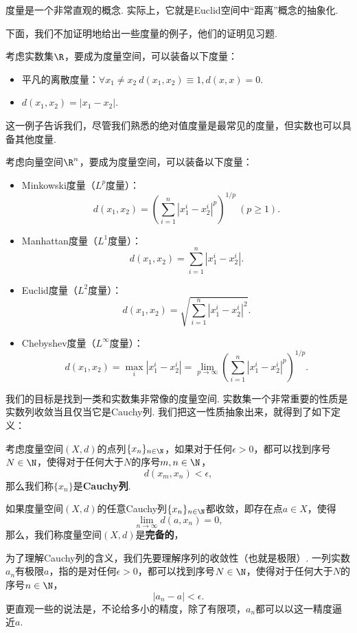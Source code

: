 度量是一个非常直观的概念. 实际上，它就是Euclid空间中“距离”概念的抽象化. 

下面，我们不加证明地给出一些度量的例子，他们的证明见习题.
\begin{example}
    考虑实数集$\R$，要成为度量空间，可以装备以下度量：
    \begin{itemize}
            \item 平凡的离散度量：$\forall x_1\neq x_2\ d(x_1,x_2)\equiv 1, d(x,x)=0$. 
            \item $d(x_1,x_2)=|x_1-x_2|$. 
        \end{itemize}
        这一例子告诉我们，尽管我们熟悉的绝对值度量是最常见的度量，但实数也可以具备其他度量.

        考虑向量空间$\R^n$，要成为度量空间，可以装备以下度量：
        \begin{itemize}
            \item Minkowski度量（$L^p$度量）：
            \[d(x_1,x_2)=\left(\sum_{i=1}^n|x_1^i-x_2^i|^p\right)^{1/p}\ (p\geq 1).\] 
            \item Manhattan度量（$L^1$度量）：
            \[d(x_1,x_2)=\sum_{i=1}^n|x_1^i-x_2^i|.\]
            \item Euclid度量（$L^2$度量）：
            \[d(x_1,x_2)=\sqrt{\sum_{i=1}^n|x_1^i-x_2^i|^2}.\]
            \item Chebyshev度量（$L^\infty$度量）：
            \[d(x_1,x_2)=\max_i|x_1^i-x_2^i|=\lim_{p\to\infty}\left(\sum_{i=1}^n|x_1^i-x_2^i|^p\right)^{1/p}.\]
        \end{itemize}
\end{example}

我们的目标是找到一类和实数集非常像的度量空间. 实数集一个非常重要的性质是实数列收敛当且仅当它是Cauchy列. 我们把这一性质抽象出来，就得到了如下定义：

\begin{definition}
    考虑度量空间$(X,d)$的点列$\{x_n\}_{n\in \N}$，如果对于任何$\epsilon>0$，都可以找到序号$N\in\N$，使得对于任何大于$N$的序号$m,n\in\N$，
    \[d(x_m,x_n)<\epsilon,\]
    那么我们称$\{x_n\}$是\textbf{Cauchy列}.

    如果度量空间$(X,d)$的任意Cauchy列$\{x_n\}_{n\in \N}$都收敛，即存在点$a\in X$，使得
    \[\lim_{n\to\infty}d(a,x_n)=0,\]
    那么，我们称度量空间$(X,d)$是\textbf{完备的}，
\end{definition}

为了理解Cauchy列的含义，我们先要理解序列的收敛性（也就是极限）. 一列实数$a_n$有极限$a$，指的是对任何$\epsilon>0$，都可以找到序号$N\in\N$，使得对于任何大于$N$的序号$n\in\N$，
\[
    |a_n-a|<\epsilon.
\]
更直观一些的说法是，不论给多小的精度，除了有限项，$a_n$都可以以这一精度逼近$a$. 

